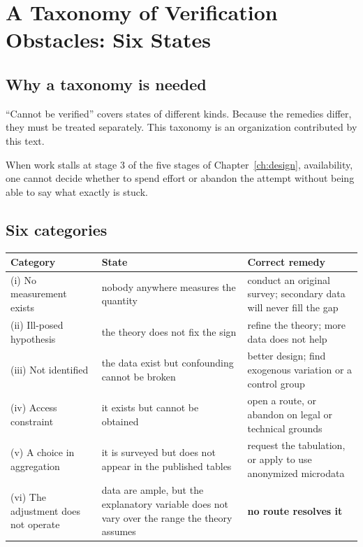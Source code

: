 \chapter{A Taxonomy of Verification Obstacles: Six States}
\label{part:obstacles}

\section{Why a taxonomy is needed}

``Cannot be verified'' covers states of different kinds. Because the remedies differ, they
must be treated separately. This taxonomy is an organization contributed by this text.

When work stalls at stage 3 of the five stages of Chapter~\ref{ch:design}, availability,
one cannot decide whether to spend effort or abandon the attempt without being able to say
what exactly is stuck.

\section{Six categories}
\label{sec:obstacle-taxonomy}

\begin{center}
\begin{tabularx}{\textwidth}{@{}l>{\raggedright\arraybackslash}p{}X@{}}
\toprule
Category & State & Correct remedy \\
\midrule
(i) No measurement exists & nobody anywhere measures the quantity & conduct an original survey; secondary data will never fill the gap \\
(ii) Ill-posed hypothesis & the theory does not fix the sign & refine the theory; more data does not help \\
(iii) Not identified & the data exist but confounding cannot be broken & better design; find exogenous variation or a control group \\
(iv) Access constraint & it exists but cannot be obtained & open a route, or abandon on legal or technical grounds \\
(v) A choice in aggregation & it is surveyed but does not appear in the published tables & request the tabulation, or apply to use anonymized microdata \\
(vi) The adjustment does not operate & data are ample, but the explanatory variable does not vary over the range the theory assumes & \textbf{no route resolves it} \\
\bottomrule
\end{tabularx}
\label{tab:obstacle-taxonomy}
\label{sec:sixth-obstacle}
\end{center}

